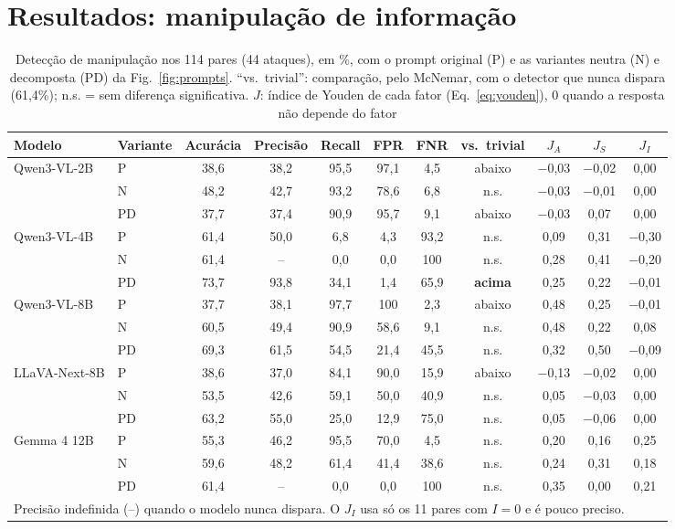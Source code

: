 \documentclass[conference]{IEEEtran}
\begin{document}
\section{Resultados: manipulação de informação}
\label{sec:res-man}

\begin{table}[!t]
\renewcommand{\arraystretch}{1.0}
\caption{Detecção de manipulação nos 114 pares (44 ataques), em \%, com o prompt original (P) e as
variantes neutra (N) e decomposta (PD) da Fig.~\ref{fig:prompts}. ``vs.~trivial'': comparação, pelo McNemar, com o detector que nunca
dispara (61,4\%); n.s. = sem diferença significativa. $J$: índice de Youden de cada fator
(Eq.~\ref{eq:youden}), 0 quando a resposta não depende do fator}
\label{tab:man}
\centering
\footnotesize
\setlength{\tabcolsep}{4.2pt}
\begin{tabular}{llccccccccc}
\toprule
Modelo & Variante & Acurácia & Precisão & Recall & FPR & FNR & vs.~trivial & $J_A$ & $J_S$ & $J_I$ \\
\midrule
\multirow{3}{*}{Qwen3-VL-2B}
 & P  & 38,6 & 38,2 & 95,5 & 97,1 & 4,5 & abaixo & $-$0,03 & $-$0,02 & 0,00 \\
 & N  & 48,2 & 42,7 & 93,2 & 78,6 & 6,8 & n.s. & $-$0,03 & $-$0,01 & 0,00 \\
 & PD & 37,7 & 37,4 & 90,9 & 95,7 & 9,1 & abaixo & $-$0,03 & 0,07 & 0,00 \\
\midrule
\multirow{3}{*}{Qwen3-VL-4B}
 & P  & 61,4 & 50,0 & 6,8 & 4,3 & 93,2 & n.s. & 0,09 & 0,31 & $-$0,30 \\
 & N  & 61,4 & -- & 0,0 & 0,0 & 100 & n.s. & 0,28 & 0,41 & $-$0,20 \\
 & PD & 73,7 & 93,8 & 34,1 & 1,4 & 65,9 & \textbf{acima} & 0,25 & 0,22 & $-$0,01 \\
\midrule
\multirow{3}{*}{Qwen3-VL-8B}
 & P  & 37,7 & 38,1 & 97,7 & 100 & 2,3 & abaixo & 0,48 & 0,25 & $-$0,01 \\
 & N  & 60,5 & 49,4 & 90,9 & 58,6 & 9,1 & n.s. & 0,48 & 0,22 & 0,08 \\
 & PD & 69,3 & 61,5 & 54,5 & 21,4 & 45,5 & n.s. & 0,32 & 0,50 & $-$0,09 \\
\midrule
\multirow{3}{*}{LLaVA-Next-8B}
 & P  & 38,6 & 37,0 & 84,1 & 90,0 & 15,9 & abaixo & $-$0,13 & $-$0,02 & 0,00 \\
 & N  & 53,5 & 42,6 & 59,1 & 50,0 & 40,9 & n.s. & 0,05 & $-$0,03 & 0,00 \\
 & PD & 63,2 & 55,0 & 25,0 & 12,9 & 75,0 & n.s. & 0,05 & $-$0,06 & 0,00 \\
\midrule
\multirow{3}{*}{Gemma 4 12B}
 & P  & 55,3 & 46,2 & 95,5 & 70,0 & 4,5 & n.s. & 0,20 & 0,16 & 0,25 \\
 & N  & 59,6 & 48,2 & 61,4 & 41,4 & 38,6 & n.s. & 0,24 & 0,31 & 0,18 \\
 & PD & 61,4 & -- & 0,0 & 0,0 & 100 & n.s. & 0,35 & 0,00 & 0,21 \\
\bottomrule
\multicolumn{11}{l}{\scriptsize Precisão indefinida (--) quando o modelo nunca dispara. O $J_I$ usa só os 11 pares com $I=0$ e é pouco preciso.}
\end{tabular}
\end{table}
\end{document}
